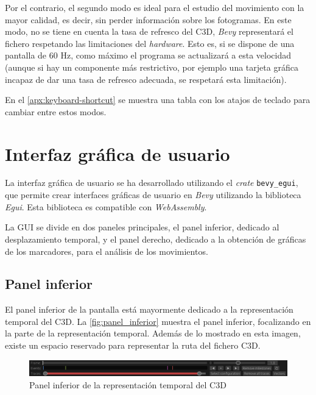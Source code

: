 Por el contrario, el segundo modo es ideal para el estudio del movimiento con la mayor calidad, es decir, sin perder información sobre los fotogramas. En este modo, no se tiene en cuenta la tasa de refresco del \ac{C3D}, \textit{Bevy} representará el fichero respetando las limitaciones del \textit{hardware}. Esto es, si se dispone de una pantalla de 60 \ac{Hz}, como máximo el programa se actualizará a esta velocidad (aunque si hay un componente más restrictivo, por ejemplo una tarjeta gráfica incapaz de dar una tasa de refresco adecuada, se respetará esta limitación). 

En el \autoref{apx:keyboard-shortcut} se muestra una tabla con los atajos de teclado para cambiar entre estos modos.

\section{Interfaz gráfica de usuario} \label{sec:gui}
La interfaz gráfica de usuario se ha desarrollado utilizando el \textit{crate} \texttt{bevy\_egui}, que permite crear interfaces gráficas de usuario en \textit{Bevy} utilizando la biblioteca \textit{Egui}. Esta biblioteca es compatible con \textit{WebAssembly}.

La \ac{GUI} se divide en dos paneles principales, el panel inferior, dedicado al desplazamiento temporal, y el panel derecho, dedicado a la obtención de gráficas de los marcadores, para el análisis de los movimientos. 

\subsection{Panel inferior} \label{sec:panel-inferior}

El panel inferior de la pantalla está mayormente dedicado a la representación temporal del \ac{C3D}. La \autoref{fig:panel_inferior} muestra el panel inferior, focalizando en la parte de la representación temporal. Además de lo mostrado en esta imagen, existe un espacio reservado para representar la ruta del fichero \ac{C3D}.

\begin{figure}[H]
  \centering
  \includegraphics[width=\textwidth]{imagenes/panel_inf.png}
  \caption{Panel inferior de la representación temporal del \acs{C3D}}
  \label{fig:panel_inferior}
\end{figure}


